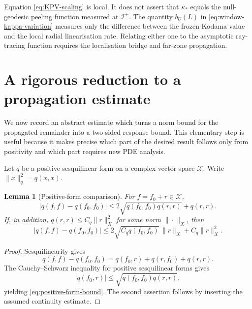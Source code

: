 \documentclass[11pt,a4paper]{article}
\newtheorem{lemma}[theorem]{Lemma}
\theoremstyle{definition}
\theoremstyle{remark}
\newcommand{\scrI}{\mathscr I}
\begin{document}
	Equation \eqref{eq:KPV-scaling} is local.  It does not assert that
	$\kappa_*$ equals the null-geodesic peeling function measured at $\scrI^+$.
	The quantity $b_U(L)$ in \eqref{eq:window-kappa-variation} measures only the
	difference between the frozen Kodama value and the local radial
	linearisation rate.  Relating either one to the asymptotic ray-tracing
	function requires the localisation bridge and far-zone propagation.
	
	\section{A rigorous reduction to a propagation estimate}
	\label{sec:reduction}
	
	We now record an abstract estimate which turns a norm bound for the propagated
	remainder into a two-sided response bound.  This elementary step is useful
	because it makes precise which part of the desired result follows only from
	positivity and which part requires new PDE analysis.
	
	Let $q$ be a positive sesquilinear form on a complex vector space $\mathscr X$.
	Write $\|x\|_q^2=q(x,x)$.
	
	\begin{lemma}[Positive-form comparison]
		\label{lem:positive-comparison}
		For $f=f_0+r\in\mathscr X$,
		\begin{equation}
			\left|q(f,f)-q(f_0,f_0)\right|
			\leq
			2\sqrt{q(f_0,f_0)q(r,r)}+q(r,r).
			\label{eq:positive-form-bound}
		\end{equation}
		If, in addition, $q(r,r)\leq C_q\|r\|_X^2$ for some norm $\|\cdot\|_X$, then
		\begin{equation}
			\left|q(f,f)-q(f_0,f_0)\right|
			\leq
			2\sqrt{C_q q(f_0,f_0)}\,\|r\|_X
			+C_q\|r\|_X^2.
			\label{eq:norm-response-bound}
		\end{equation}
	\end{lemma}
	
	\begin{proof}
		Sesquilinearity gives
		\begin{equation}
			q(f,f)-q(f_0,f_0)=q(f_0,r)+q(r,f_0)+q(r,r).
		\end{equation}
		The Cauchy--Schwarz inequality for positive sesquilinear forms gives
		\begin{equation*}
			|q(f_0,r)|\leq\sqrt{q(f_0,f_0)q(r,r)},
		\end{equation*}
		yielding
		\eqref{eq:positive-form-bound}.  The second assertion follows by inserting
		the assumed continuity estimate.
	\end{proof}
	
\end{document}
